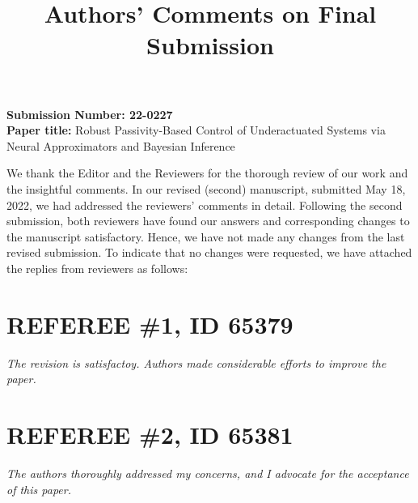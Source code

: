 \documentclass[11pt]{article}
\def \revname {[Assign the Reviewer code before!]}
\newcommand{\setrevname}[1]{\def \revname {#1}}
\newcounter{AR_index}
\newcommand{\resetquestioncounter}{\setcounter{AR_index}{0}}
\begin{document}
\title{Authors' Comments on Final Submission}
\maketitle

\noindent
\textbf{Submission Number: 22-0227}  \\%
\textbf{Paper title:} Robust Passivity-Based Control of Underactuated Systems via Neural Approximators and Bayesian Inference

\bigskip \bigskip \noindent 
%
We thank the Editor and the Reviewers for the thorough review of our work and
the insightful comments. 
%
In our revised (second) manuscript, submitted May 18, 2022, we had addressed
the reviewers' comments in detail.
%
Following the second submission, both reviewers have found our answers and
corresponding changes to the manuscript satisfactory.
%
Hence, we have not made any changes from the last revised submission.
% 
To indicate that no changes were requested, we have attached the replies from
reviewers as follows:
%




\resetquestioncounter
\setrevname{Ref-1}
\section*{REFEREE \#1, ID 65379}

\textit{%
    The revision is satisfactoy. Authors made considerable efforts to
    improve the paper.
}

\resetquestioncounter
\setrevname{Ref-2}
\section*{REFEREE \#2, ID 65381}

\textit{%
    The authors thoroughly addressed my concerns, and I advocate for the
    acceptance of this paper. %
}
\end{document}
